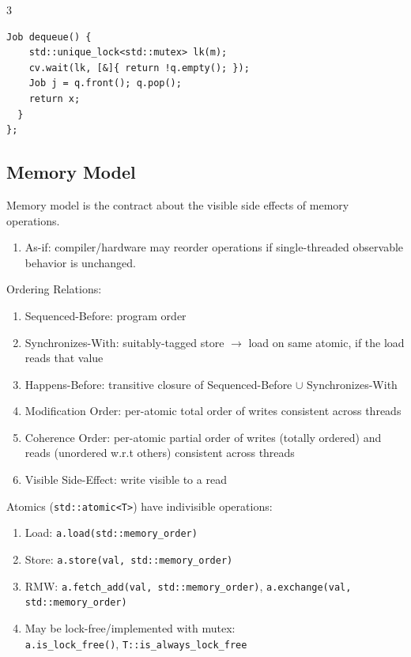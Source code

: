\documentclass[12pt, a4paper]{article}
\begin{document}
\begin{multicols*}{3}
\begin{lstlisting}[basicstyle=\ttfamily\scriptsize]
  Job dequeue() {
    std::unique_lock<std::mutex> lk(m);
    cv.wait(lk, [&]{ return !q.empty(); });
    Job j = q.front(); q.pop();
    return x;
  }
};
\end{lstlisting}
\vspace{-1em}
\colbreak
\subsection{Memory Model}
Memory model is the contract about the visible side effects of memory operations.
\begin{enumerate}[\roman*.]
  \item As-if: compiler/hardware may reorder operations if single-threaded observable behavior is unchanged.
\end{enumerate}

Ordering Relations:
\begin{enumerate}[\roman*.]
  \item Sequenced-Before: program order
  \item Synchronizes-With: suitably-tagged store $\to$ load on same atomic, if the load reads that value 
  \item Happens-Before: transitive closure of Sequenced-Before $\cup$ Synchronizes-With 
  \item Modification Order: per-atomic total order of writes consistent across threads 
  \item Coherence Order: per-atomic partial order of writes (totally ordered) and reads (unordered w.r.t others) consistent across threads
  \item Visible Side-Effect: write visible to a read 
\end{enumerate}

Atomics (\lstinline|std::atomic<T>|) have indivisible operations:
\begin{enumerate}[\roman*.]
  \item Load: \lstinline|a.load(std::memory_order)|
  \item Store: \lstinline|a.store(val, std::memory_order)| 
  \item RMW: \lstinline|a.fetch_add(val, std::memory_order)|, \lstinline|a.exchange(val, std::memory_order)|
  \item May be lock-free/implemented with mutex:\\
    \lstinline|a.is_lock_free()|, \lstinline|T::is_always_lock_free|
\end{enumerate}


\end{multicols*}
\end{document}
